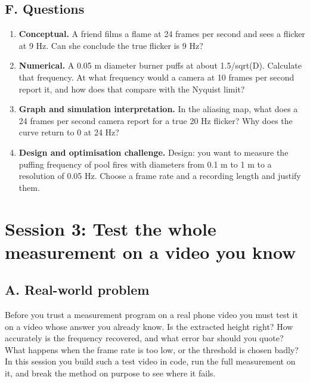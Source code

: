 \documentclass[11pt,a4paper]{article}
\begin{document}
\subsection*{F. Questions}
\begin{enumerate}[nosep]
\item \textbf{Conceptual.} A friend films a flame at 24 frames per second and sees a flicker at 9 Hz. Can she conclude the true flicker is 9 Hz?
\item \textbf{Numerical.} A 0.05 m diameter burner puffs at about 1.5/sqrt(D). Calculate that frequency. At what frequency would a camera at 10 frames per second report it, and how does that compare with the Nyquist limit?
\item \textbf{Graph and simulation interpretation.} In the aliasing map, what does a 24 frames per second camera report for a true 20 Hz flicker? Why does the curve return to 0 at 24 Hz?
\item \textbf{Design and optimisation challenge.} Design: you want to measure the puffing frequency of pool fires with diameters from 0.1 m to 1 m to a resolution of 0.05 Hz. Choose a frame rate and a recording length and justify them.
\end{enumerate}

\section{Session 3: Test the whole measurement on a video you know}

\subsection*{A. Real-world problem}
Before you trust a measurement program on a real phone video you must test it on a video whose answer you already know. Is the extracted height right? How accurately is the frequency recovered, and what error bar should you quote? What happens when the frame rate is too low, or the threshold is chosen badly? In this session you build such a test video in code, run the full measurement on it, and break the method on purpose to see where it fails.
\end{document}
